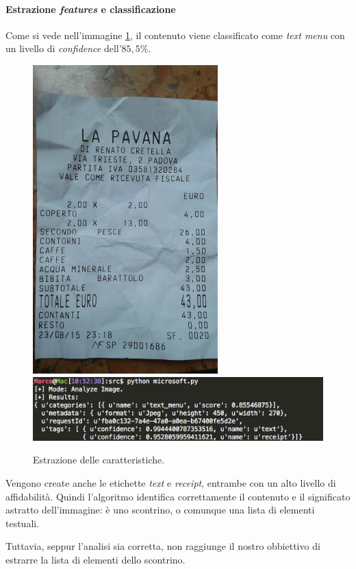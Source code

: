\documentclass[fleqn,a4paper,11pt]{report}
\begin{document}
\paragraph{Estrazione \textit{features} e classificazione} Come si vede nell'immagine \ref{ms-analyze}, il contenuto viene classificato come \textit{text menu} con un livello di \textit{confidence} dell'$85,5\%$.
\begin{figure}[htbp]
\begin{center}
	\includegraphics[height=.3\textwidth]{img/scontrino.jpg}
	 \hspace*{.5in}
	\includegraphics[height=.1\textwidth]{img/ms-analyze.png}
\caption{Estrazione delle caratteristiche.}
\label{ms-analyze}
\end{center}
\end{figure}
Vengono create anche le etichette \textit{text} e \textit{receipt}, entrambe con un alto livello di affidabilità. Quindi l'algoritmo identifica correttamente il contenuto e il significato astratto dell'immagine: è uno scontrino, o comunque una lista di elementi testuali.

Tuttavia, seppur l'analisi sia corretta, non raggiunge il nostro obbiettivo di estrarre la lista di elementi dello scontrino.
\end{document}

